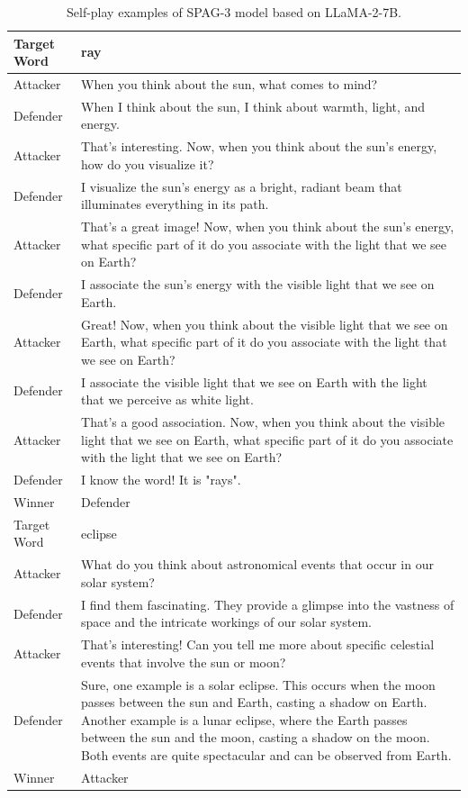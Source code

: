 \documentclass{article}
\theoremstyle{plain}
\theoremstyle{definition}
\theoremstyle{remark}
\begin{document}
\begin{table}[h]
    \centering
 \begin{tabular}{p{} p{}}  
 \midrule[1.5pt]
 Target Word & ray 
\\
\midrule
Attacker & When you think about the sun, what comes to mind?
\\
\midrule
Defender &  When I think about the sun, I think about warmth, light, and energy.\
\\
\midrule
Attacker & That's interesting. Now, when you think about the sun's energy, how do you visualize it?
\\
\midrule
Defender &  I visualize the sun's energy as a bright, radiant beam that illuminates everything in its path.
\\
\midrule
Attacker & That's a great image! Now, when you think about the sun's energy, what specific part of it do you associate with the light that we see on Earth?
\\
\midrule
Defender & I associate the sun's energy with the visible light that we see on Earth.
\\
\midrule
Attacker & Great! Now, when you think about the visible light that we see on Earth, what specific part of it do you associate with the light that we see on Earth?
\\
\midrule
Defender & I associate the visible light that we see on Earth with the light that we perceive as white light.
\\
\midrule
Attacker & That's a good association. Now, when you think about the visible light that we see on Earth, what specific part of it do you associate with the light that we see on Earth?
\\
\midrule
Defender & I know the word! It is "rays".
\\
\midrule
Winner & Defender
\\
\midrule[1.5pt]
Target Word & eclipse \\
\midrule
Attacker & What do you think about astronomical events that occur in our solar system?
\\
\midrule
Defender & I find them fascinating. They provide a glimpse into the vastness of space and the intricate workings of our solar system.\
\\
\midrule
Attacker & That's interesting! Can you tell me more about specific celestial events that involve the sun or moon?
\\
\midrule
Defender & Sure, one example is a solar eclipse. This occurs when the moon passes between the sun and Earth, casting a shadow on Earth. Another example is a lunar eclipse, where the Earth passes between the sun and the moon, casting a shadow on the moon. Both events are quite spectacular and can be observed from Earth.
\\
\midrule Winner & Attacker
\\
\midrule[1.5pt]
\end{tabular}
   \caption{Self-play examples of SPAG-3 model based on LLaMA-2-7B. }
    \label{tab:sp-example-spag3-llama}
\end{table}
\end{document}
